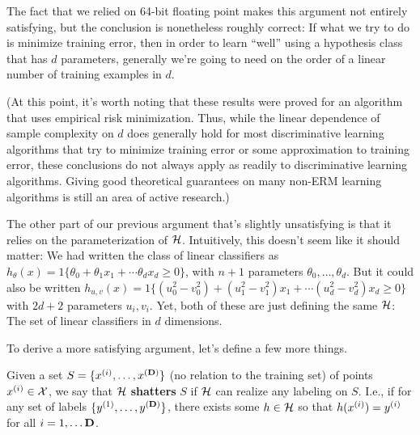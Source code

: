 \documentclass{article} %
\renewcommand{\di}{d}
\begin{document}
The fact that we relied on 64-bit floating point makes this argument not entirely satisfying,
but the conclusion is nonetheless roughly correct: If what we try to do is minimize training error,
then in order to learn ``well'' using a hypothesis class that has $\di$ parameters, generally we're
going to need on the order of a linear number of training examples in $\di$.

(At this point, it's worth noting that these results were proved for an algorithm
that uses empirical risk minimization.  Thus, while the linear dependence of sample
complexity on $\di$ does generally
hold for most discriminative learning algorithms that try to minimize training
error or some approximation to training error, these conclusions do not
always apply as readily to discriminative learning algorithms.  Giving good theoretical
guarantees on many non-ERM learning algorithms is still an area of
active research.)


The other part of our previous argument that's slightly unsatisfying is that
it relies on the parameterization of ${\cal H}$.
Intuitively, this doesn't seem like it should matter: We had written the class
of linear classifiers as
$h_\theta(x) = 1\{\theta_0 + \theta_1 x_1 + \cdots \theta_{\di} x_{\di} \geq 0\}$,
with $n+1$ parameters $\theta_0, \ldots, \theta_{\di}$.
But it could also be written
$h_{u,v}(x) = 1\{(u^2_0 - v^2_0) + (u^2_1 - v^2_1) x_1 + \cdots (u^2_{\di} - v^2_{\di}) x_{\di} \geq 0\}$ with $2\di+2$ parameters $u_i, v_i$.
Yet, both of these are just defining the same ${\cal H}$: The set of linear classifiers in $\di$ dimensions.

To derive a more satisfying argument, let's define a few more things.

Given a set $S = \{{x^{(i)}}, \ldots, {x^{({\textbf{D}})}}\}$ (no relation to the training set)
of points ${x^{(i)}} \in {\cal X}$, we say that ${\cal H}$ {\bf shatters} $S$ if ${\cal H}$ can realize any
labeling on $S$. I.e., if for any set of labels $\{y^{(1)}, \ldots, y^{({\textbf{D}})}\}$,
there exists
some $h \in {\cal H}$ so that $h({x^{(i)}}) = {y^{(i)}}$ for all $i=1,\ldots {\textbf{D}}$.
\end{document}
